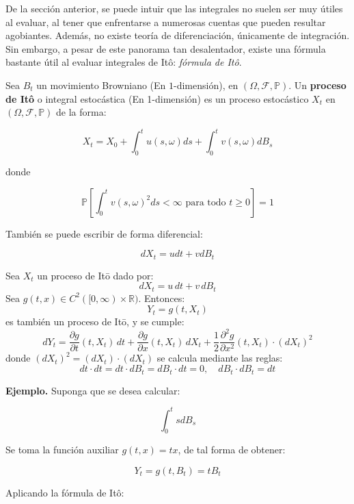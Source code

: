 De la sección anterior, se puede intuir que las integrales no suelen ser muy útiles al evaluar, al tener que enfrentarse a numerosas cuentas que pueden resultar agobiantes. Además, no existe teoría de diferenciación, únicamente de integración.\\

Sin embargo, a pesar de este panorama tan desalentador, existe una fórmula bastante útil al evaluar integrales de Itô: \textit{fórmula de Itô}.

\begin{boxDef}
	Sea $B_t$ un movimiento Browniano (En $1$-dimensión), en $(\Omega, \mathcal{F}, \mathbb{P})$. Un \textbf{proceso de Itô} o integral estocástica (En 1-dimensión) es un proceso estocástico $X_t$ en $(\Omega, \mathcal{F}, \mathbb{P})$ de la forma:

	\[
		X_t = X_0 + \int_0^t u(s, \omega) ds + \int_0^t v(s, \omega) dB_s	
	\]

	donde

	\[
		\mathbb{P}\left[ \int_0^t v(s,\omega)^2 ds < \infty \text{ para todo } t \geq 0 \right] = 1
	\]

\end{boxDef}

También se puede escribir de forma diferencial:

\[
	dX_t = u dt + v dB_t
\]

\begin{theorem}
	Sea \( X_{t} \) un proceso de Itō dado por:
	\[
	dX_{t} = u \, dt + v \, dB_{t}
	\]
	Sea \( g(t,x) \in C^{2}([0,\infty) \times \mathbb{R}) \). Entonces:
	\[
	Y_{t} = g(t, X_{t})
	\]
	es también un proceso de Itō, y se cumple:
	\[
	dY_{t} = \frac{\partial g}{\partial t}(t, X_{t}) \, dt + \frac{\partial g}{\partial x}(t, X_{t}) \, dX_{t} + \frac{1}{2} \frac{\partial^{2} g}{\partial x^{2}}(t, X_{t}) \cdot (dX_{t})^{2}
	\]
	donde \( (dX_{t})^{2} = (dX_{t}) \cdot (dX_{t}) \) se calcula mediante las reglas:
	\[
	dt \cdot dt = dt \cdot dB_{t} = dB_{t} \cdot dt = 0, \quad dB_{t} \cdot dB_{t} = dt
	\]
\end{theorem}

\textbf{Ejemplo.} Suponga que se desea calcular:

\[
	\int_0^t s dB_s
\]

Se toma la función auxiliar $g(t, x) = tx$, de tal forma de obtener:

\[
	Y_t = g(t, B_t) = tB_t
\]

Aplicando la fórmula de Itô:

